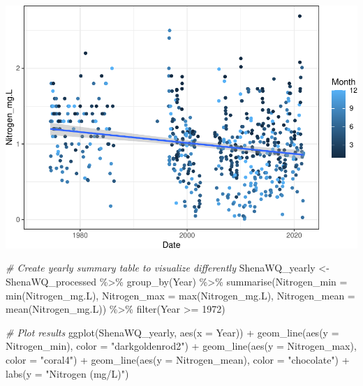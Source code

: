\documentclass[
  12pt,
]{article}
\newenvironment{Shaded}{\begin{snugshade}}{\end{snugshade}}
\newcommand{\AttributeTok}[1]{\textcolor[rgb]{0.77,0.63,0.00}{#1}}
\newcommand{\CommentTok}[1]{\textcolor[rgb]{0.56,0.35,0.01}{\textit{#1}}}
\newcommand{\DecValTok}[1]{\textcolor[rgb]{0.00,0.00,0.81}{#1}}
\newcommand{\FunctionTok}[1]{\textcolor[rgb]{0.00,0.00,0.00}{#1}}
\newcommand{\NormalTok}[1]{#1}
\newcommand{\OtherTok}[1]{\textcolor[rgb]{0.56,0.35,0.01}{#1}}
\newcommand{\SpecialCharTok}[1]{\textcolor[rgb]{0.00,0.00,0.00}{#1}}
\newcommand{\StringTok}[1]{\textcolor[rgb]{0.31,0.60,0.02}{#1}}
\begin{document}
\includegraphics{Project_Template_files/figure-latex/Nitrogen_Analysis-1.pdf}

\begin{Shaded}
\begin{Highlighting}[]
\CommentTok{\# Create yearly summary table to visualize differently}
\NormalTok{ShenaWQ\_yearly }\OtherTok{\textless{}{-}}\NormalTok{ ShenaWQ\_processed }\SpecialCharTok{\%\textgreater{}\%}
  \FunctionTok{group\_by}\NormalTok{(Year) }\SpecialCharTok{\%\textgreater{}\%}
  \FunctionTok{summarise}\NormalTok{(}\AttributeTok{Nitrogen\_min =} \FunctionTok{min}\NormalTok{(Nitrogen\_mg.L),}
            \AttributeTok{Nitrogen\_max =} \FunctionTok{max}\NormalTok{(Nitrogen\_mg.L),}
            \AttributeTok{Nitrogen\_mean =} \FunctionTok{mean}\NormalTok{(Nitrogen\_mg.L)) }\SpecialCharTok{\%\textgreater{}\%}
  \FunctionTok{filter}\NormalTok{(Year }\SpecialCharTok{\textgreater{}=} \DecValTok{1972}\NormalTok{)}

\CommentTok{\# Plot results}
\FunctionTok{ggplot}\NormalTok{(ShenaWQ\_yearly, }\FunctionTok{aes}\NormalTok{(}\AttributeTok{x =}\NormalTok{ Year)) }\SpecialCharTok{+}
  \FunctionTok{geom\_line}\NormalTok{(}\FunctionTok{aes}\NormalTok{(}\AttributeTok{y =}\NormalTok{ Nitrogen\_min), }\AttributeTok{color =} \StringTok{"darkgoldenrod2"}\NormalTok{) }\SpecialCharTok{+}
  \FunctionTok{geom\_line}\NormalTok{(}\FunctionTok{aes}\NormalTok{(}\AttributeTok{y =}\NormalTok{ Nitrogen\_max), }\AttributeTok{color =} \StringTok{"coral4"}\NormalTok{) }\SpecialCharTok{+}
  \FunctionTok{geom\_line}\NormalTok{(}\FunctionTok{aes}\NormalTok{(}\AttributeTok{y =}\NormalTok{ Nitrogen\_mean), }\AttributeTok{color =} \StringTok{"chocolate"}\NormalTok{) }\SpecialCharTok{+}
  \FunctionTok{labs}\NormalTok{(}\AttributeTok{y =} \StringTok{"Nitrogen (mg/L)"}\NormalTok{)}
\end{Highlighting}
\end{Shaded}
\end{document}
